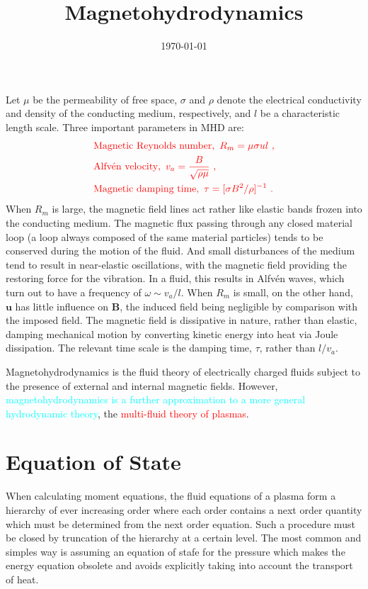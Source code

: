 \documentclass[12pt,a4paper]{article}
\title{Magnetohydrodynamics}
\author{}
\date{\today}
\renewcommand{\vec}[1]{\boldsymbol{#1}}
\newcounter{theo}[section]\setcounter{theo}{0}
\begin{document}
\maketitle
\cite{2001imhd.book.....D} Let $\mu$ be the permeability of free space, $\sigma$ and $\rho$ denote the electrical conductivity and density of the conducting medium, respectively, and $l$ be a characteristic length scale. Three important parameters in MHD are:
\begin{align}
& \color{red} \text{Magnetic Reynolds number}, ~R_m = \mu \sigma u l ~,\\
& \color{red} \text{Alfv\'en velocity}, ~v_a = \dfrac{B}{\sqrt{\rho \mu} } ~,\\
& \color{red} \text{Magnetic damping time}, ~\tau = [\sigma B^2 /\rho]^{-1} ~.
\end{align}
When $R_m$ is large, the magnetic field lines act rather like elastic bands frozen into the conducting medium. The magnetic flux passing through any closed material loop (a loop always composed of the same material particles) tends to be conserved during the motion of the fluid. And small disturbances of the medium tend to result in near-elastic oscillations, with the magnetic field providing the restoring force for the vibration. In a fluid, this results in Alfv\'en waves, which turn out to have a frequency of $\omega \sim v_a/l$. When $R_m$ is small, on the other hand, $\vec{u}$ has little influence on $\vec{B}$, the induced field being negligible by comparison with the imposed field. The magnetic field is dissipative in nature, rather than elastic, damping mechanical motion by converting kinetic energy into heat via Joule dissipation. The relevant time scale is the damping time, $\tau$, rather than $l/v_a$.



\cite{1996bspp.book.....B} Magnetohydrodynamics is the fluid theory of electrically charged fluids subject to the presence of external and internal magnetic fields. However, \textcolor{cyan}{magnetohydrodynamics is a further approximation to a more general hydrodynamic theory}, the \textcolor{red}{multi-fluid theory of plasmas}. 
\section{Equation of State}
\cite{1996bspp.book.....B} When calculating moment equations, the fluid equations of a plasma form a hierarchy of ever increasing order where each order contains a next order quantity which must be determined from the next order equation. Such a procedure must be closed by truncation of the hierarchy at a certain level. The most common and simples way is assuming an equation of stafe for the pressure which makes the energy equation obsolete and avoids explicitly taking into account the transport of heat.
\end{document}
